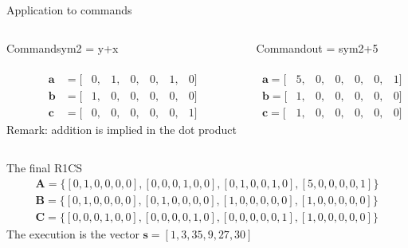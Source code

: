 \documentclass[handout]{beamer}
\begin{document}
\begin{frame}{Application to commands}   
    \begin{columns}[T] %
    \begin{column}{.48\textwidth}
    \begin{block}{Command}sym2 = y+x\end{block}
    
    \begin{align*}       
         [ &one,&x,&out,&sym_1,&y,&sym_2 ]\\ 
         \bm{a} &= [&0,&1,&0,&0,&1,&0]  \\ 
         \bm{b} &= [&1,&0,&0,&0,&0,&0]  \\
         \bm{c} &= [&0,&0,&0,&0,&0,&1] 
    \end{align*}    
    Remark: addition is implied in the dot product
    \end{column}%
    \hfill%
    \begin{column}{.48\textwidth}
    \begin{block}{Command}out = sym2+5\end{block}
    
    \begin{align*}     
         [ &one,&x,&out,&sym_1,&y,&sym_2 ]\\    
         \bm{a} = [&5,&0,&0,&0,&0,&1]  \\
         \bm{b} = [&1,&0,&0,&0,&0,&0]  \\
         \bm{c} = [&1,&0,&0,&0,&0,&0] 
    \end{align*}    
    \end{column}%
\end{columns} 
\end{frame}

\begin{frame}{The final R1CS}
    \begin{align*}        
         \bm{A} = \{[0,1,0,0,0,0], [0,0,0,1,0,0],[0,1,0,0,1,0],[5,0,0,0,0,1]  \}\\
         \bm{B} = \{[0,1,0,0,0,0],[0,1,0,0,0,0],[1,0,0,0,0,0] ,[1,0,0,0,0,0]  \}\\
         \bm{C} = \{[0,0,0,1,0,0], [0,0,0,0,1,0], [0,0,0,0,0,1] ,[1,0,0,0,0,0]  \}
    \end{align*}  
    The execution is the vector  $\bm{s} = [1,3,35,9,27,30] $
\end{frame}
\end{document}
